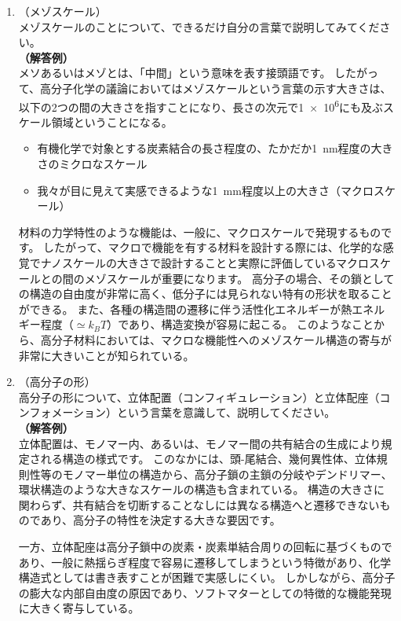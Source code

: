 \documentclass[a4paper,11pt]{jlreq}
\begin{document}
\begin{enumerate}
\item （メゾスケール）\\メゾスケールのことについて、できるだけ自分の言葉で説明してみてください。\\
		\textbf{（解答例）}\\メソあるいはメゾとは、「中間」という意味を表す接頭語です。
		したがって、高分子化学の議論においてはメゾスケールという言葉の示す大きさは、以下の2つの間の大きさを指すことになり、長さの次元で\num{1e6}にも及ぶスケール領域ということになる。
        \begin{itemize}
            \item 有機化学で対象とする炭素結合の長さ程度の、たかだか\qty{1}{nm}程度の大きさのミクロなスケール
            \item 我々が目に見えて実感できるような\qty{1}{mm}程度以上の大きさ（マクロスケール）
        \end{itemize}
		材料の力学特性のような機能は、一般に、マクロスケールで発現するものです。
        したがって、マクロで機能を有する材料を設計する際には、化学的な感覚でナノスケールの大きさで設計することと実際に評価しているマクロスケールとの間のメゾスケールが重要になります。
		高分子の場合、その鎖としての構造の自由度が非常に高く、低分子には見られない特有の形状を取ることができる。
		また、各種の構造間の遷移に伴う活性化エネルギーが熱エネルギー程度（$\simeq k_B T$）であり、構造変換が容易に起こる。
		このようなことから、高分子材料においては、マクロな機能性へのメゾスケール構造の寄与が非常に大きいことが知られている。

\item （高分子の形）\\高分子の形について、立体配置（コンフィギュレーション）と立体配座（コンフォメーション）という言葉を意識して、説明してください。\\
		\textbf{（解答例）}\\立体配置は、モノマー内、あるいは、モノマー間の共有結合の生成により規定される構造の様式です。
        このなかには、頭-尾結合、幾何異性体、立体規則性等のモノマー単位の構造から、高分子鎖の主鎖の分岐やデンドリマー、環状構造のような大きなスケールの構造も含まれている。
		構造の大きさに関わらず、共有結合を切断することなしには異なる構造へと遷移できないものであり、高分子の特性を決定する大きな要因です。

		一方、立体配座は高分子鎖中の炭素・炭素単結合周りの回転に基づくものであり、一般に熱揺らぎ程度で容易に遷移してしまうという特徴があり、化学構造式としては書き表すことが困難で実感しにくい。
		しかしながら、高分子の膨大な内部自由度の原因であり、ソフトマターとしての特徴的な機能発現に大きく寄与している。

\end{enumerate}
\end{document}
